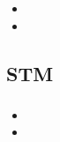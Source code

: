\documentclass{beamer}
\begin{document}
\begin{frame}
\frametitle{}
\begin{itemize}
  \item
  \item
\end{itemize}
\end{frame}



\subsection[Ergebnisse]{STM}

\begin{frame}
\frametitle{}
\begin{itemize}
  \item
  \item
\end{itemize}
\end{frame}












\end{document}

